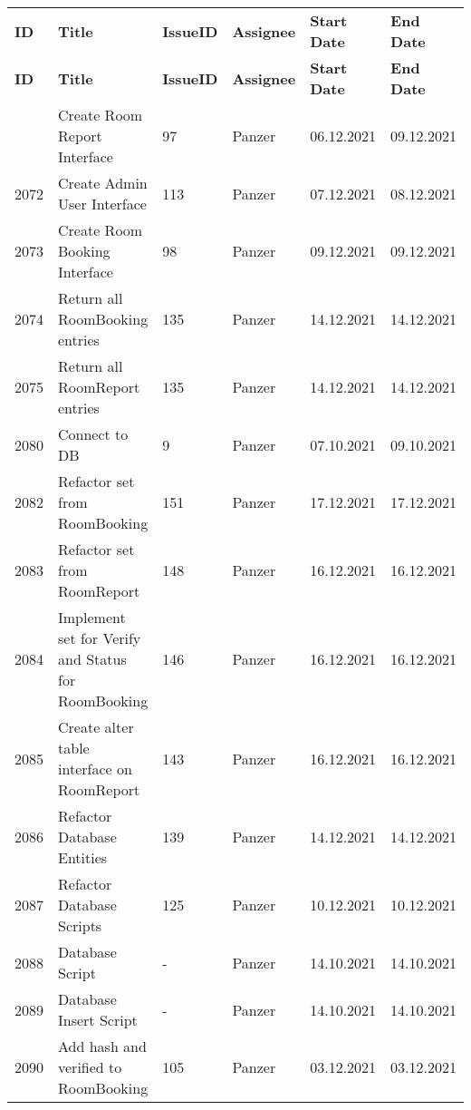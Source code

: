 
\begin{longtable}{|p{}|p{}|p{}|p{}|p{}|p{}|} \hline
    \textbf{ID} & \textbf{Title} & \textbf{Issue\-ID} & \textbf{Assignee} & \textbf{Start Date} & \textbf{End \linebreak Date} \\ \hhline{|=|=|=|=|=|=|}
    \endfirsthead
    \hline
    \textbf{ID} & \textbf{Title} & \textbf{Issue\-ID} & \textbf{Assignee} & \textbf{Start Date} & \textbf{End \linebreak Date} \\ \hhline{|=|=|=|=|=|=|}
    \endhead
    2071 & Create Room Report Interface & 97 & Panzer & 06.12.2021 & 09.12.2021 \\ \hline
    2072 & Create Admin User Interface & 113 & Panzer & 07.12.2021 & 08.12.2021 \\ \hline
    2073 & Create Room Booking Interface & 98 & Panzer & 09.12.2021 & 09.12.2021 \\ \hline
    2074 & Return all RoomBooking entries & 135 & Panzer & 14.12.2021 & 14.12.2021 \\ \hline
    2075 & Return all RoomReport entries & 135 & Panzer & 14.12.2021 & 14.12.2021 \\ \hline
    2080 & Connect to DB & 9 & Panzer & 07.10.2021 & 09.10.2021 \\ \hline
    2082 & Refactor set from RoomBooking & 151 & Panzer & 17.12.2021 & 17.12.2021 \\ \hline
    2083 & Refactor set from RoomReport & 148 & Panzer & 16.12.2021 & 16.12.2021 \\ \hline
    2084 & Implement set for Verify and Status for RoomBooking & 146 & Panzer & 16.12.2021 & 16.12.2021 \\ \hline
    2085 & Create alter table interface on RoomReport & 143 & Panzer & 16.12.2021 & 16.12.2021 \\ \hline
    2086 & Refactor Database Entities & 139 & Panzer & 14.12.2021 & 14.12.2021 \\ \hline
    2087 & Refactor Database Scripts & 125 & Panzer & 10.12.2021 & 10.12.2021 \\ \hline
    2088 & Database Script & - & Panzer & 14.10.2021 & 14.10.2021 \\ \hline
    2089 & Database Insert Script & - & Panzer & 14.10.2021 & 14.10.2021 \\ \hline
    2090 & Add hash and verified to RoomBooking & 105 & Panzer & 03.12.2021 & 03.12.2021 \\ \hline

\end{longtable}
